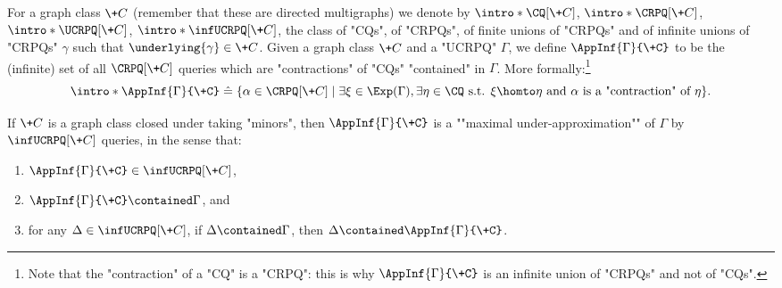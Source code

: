 For a graph class $\+C$ (remember that these are directed multigraphs) we denote by \AP$\intro*\CQ[\+C]$, $\intro*\CRPQ[\+C]$, $\intro*\UCRPQ[\+C]$, $\intro*\infUCRPQ[\+C]$, the class of "CQs", of "CRPQs", of finite unions of "CRPQs" 
and of infinite unions of "CRPQs" $\gamma$ such that $\underlying{\gamma} \in \+C$.
Given a graph class $\+C$ and a "UCRPQ" $\Gamma$, we define $\AppInf{\Gamma}{\+C}$ to be the (infinite) set of all $\CRPQ[\+C]$ queries which are "contractions" of "CQs" "contained" in $\Gamma$. More formally:\footnote{Note that the "contraction" of a "CQ" is a "CRPQ": this is why $\AppInf{\Gamma}{\+C}$ is an infinite union of "CRPQs" and not of "CQs".}
\[
	\intro*\AppInf{\Gamma}{\+C} \defeq \{
		\alpha \in \CRPQ[\+C] \mid \exists \xi \in \Exp(\Gamma), \exists \eta \in \CQ \text{ s.t. }
		\xi \homto \eta \text{ and } \alpha \text{ is a "contraction" of } \eta
	\}.
\]
\begin{proposition}
	\AP\label{prop:max-under-approx}
	If $\+C$ is a graph class closed under taking "minors", then
	$\AppInf{\Gamma}{\+C}$ is a \AP""maximal under-approximation"" of $\Gamma$ by $\infUCRPQ[\+C]$ queries, in the sense that:
	\begin{enumerate}
		\item $\AppInf{\Gamma}{\+C} \in \infUCRPQ[\+C]$,
		\item $\AppInf{\Gamma}{\+C} \contained \Gamma$, and
		\item for any $\Delta \in \infUCRPQ[\+C]$, if $\Delta \contained \Gamma$, then $\Delta \contained \AppInf{\Gamma}{\+C}$.
	\end{enumerate}
\end{proposition}

